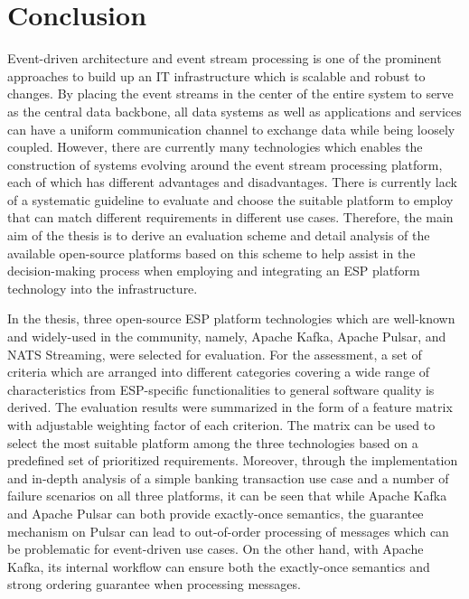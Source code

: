 \chapter{Conclusion}
Event-driven architecture and event stream processing is one of the prominent approaches to build up an IT infrastructure which is scalable and robust to changes. By placing the event streams in the center of the entire system to serve as the central data backbone, all data systems as well as applications and services can have a uniform communication channel to exchange data while being loosely coupled. However, there are currently many technologies which enables the construction of systems evolving around the event stream processing platform, each of which has different advantages and disadvantages. There is currently lack of a systematic guideline to evaluate and choose the suitable platform to employ that can match different requirements in different use cases. Therefore, the main aim of the thesis is to derive an evaluation scheme and detail analysis of the available open-source platforms based on this scheme to help assist in the decision-making process when employing and integrating an ESP platform technology into the infrastructure.

In the thesis, three open-source ESP platform technologies which are well-known and widely-used in the community, namely, Apache Kafka, Apache Pulsar, and NATS Streaming, were selected for evaluation. For the assessment, a set of criteria which are arranged into different categories covering a wide range of characteristics from ESP-specific functionalities to general software quality is derived. The evaluation results were summarized in the form of a feature matrix with adjustable weighting factor of each criterion. The matrix can be used to select the most suitable platform among the three technologies based on a predefined set of prioritized requirements. Moreover, through the implementation and in-depth analysis of a simple banking transaction use case and a number of failure scenarios on all three platforms, it can be seen that while Apache Kafka and Apache Pulsar can both provide exactly-once semantics, the guarantee mechanism on Pulsar can lead to out-of-order processing of messages which can be problematic for event-driven use cases. On the other hand, with Apache Kafka, its internal workflow can ensure both the exactly-once semantics and strong ordering guarantee when processing messages. 


